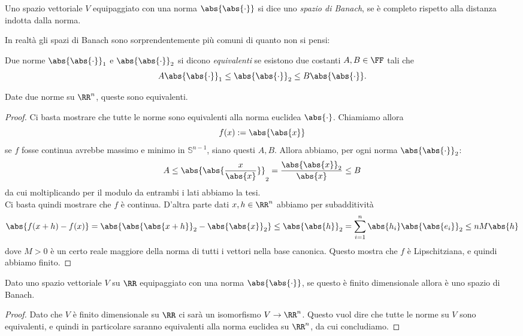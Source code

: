 \documentclass[11pt]{scrartcl}
\begin{document}
	\begin{definition}
		Uno spazio vettoriale $V$ equipaggiato con una norma $\abs{\abs{\cdot}}$ si dice uno \textit{spazio di Banach}, se è completo rispetto alla distanza indotta dalla norma. 
	\end{definition}
	In realtà gli spazi di Banach sono sorprendentemente più comuni di quanto non si pensi:
	\begin{definition}
		Due norme $\abs{\abs{\cdot}}_1$ e $\abs{\abs{\cdot}}_2$ si dicono \textit{equivalenti} se esistono due costanti $A,B\in \FF$ tali che
		$$A\abs{\abs{\cdot}}_1\le \abs{\abs{\cdot}}_2 \le B\abs{\abs{\cdot}}.$$
	\end{definition}
	\begin{proposition}
		Date due norme su $\RR^n$, queste sono equivalenti.
	\end{proposition}
	\begin{proof}
		Ci basta mostrare che tutte le norme sono equivalenti alla norma euclidea $\abs{\cdot}$. Chiamiamo allora 
		$$f(x):=\abs{\abs{x}}$$
		se $f$ fosse continua avrebbe massimo e minimo in $\mathbb{S}^{n-1}$, siano questi $A,B$. Allora abbiamo, per ogni norma $\abs{\abs{\cdot}}_2$:
		$$A\le \abs{\abs{\frac{x}{\abs{x}}}}_2=\frac{\abs{\abs{x}}_2}{\abs{x}}\le B$$
		da cui moltiplicando per il modulo da entrambi i lati abbiamo la tesi. \\
		Ci basta quindi mostrare che $f$ è continua. D'altra parte dati $x,h\in \RR^n$ abbiamo per subadditività
		$$\abs{f(x+h)-f(x)}=\abs{\abs{\abs{x+h}}_2-\abs{\abs{x}}_2}\le \abs{\abs{h}}_2=\sum_{i=1}^n\abs{h_i}\abs{\abs{e_i}}_2\le nM\abs{h}$$
		dove $M>0$ è un certo reale maggiore della norma di tutti i vettori nella base canonica. Questo mostra che $f$ è Lipschitziana, e quindi abbiamo finito.
	\end{proof}
	\begin{proposition}
		Dato uno spazio vettoriale $V$ su $\RR$ equipaggiato con una norma $\abs{\abs{\cdot}}$, se questo è finito dimensionale allora è uno spazio di Banach. 
	\end{proposition}
	\begin{proof}
		Dato che $V$ è finito dimensionale su $\RR$ ci sarà un isomorfismo $V\to\RR^n$. Questo vuol dire che tutte le norme su $V$ sono equivalenti, e quindi in particolare saranno equivalenti alla norma euclidea su $\RR^n$, da cui concludiamo.
	\end{proof}
\end{document}
